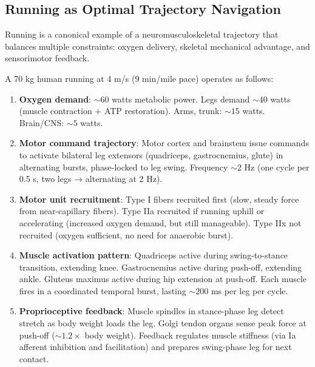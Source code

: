 \subsection{Running as Optimal Trajectory Navigation}
\label{subsec:running-example}

Running is a canonical example of a neuromusculoskeletal trajectory that balances multiple constraints: oxygen delivery, skeletal mechanical advantage, and sensorimotor feedback.

\begin{example}
\label{ex:running-steady}
A 70 kg human running at 4 m/s (9 min/mile pace) operates as follows:

\begin{enumerate}[label=(\arabic*), noitemsep]
\item \textbf{Oxygen demand}: $\sim 60$ watts metabolic power. Legs demand $\sim 40$ watts (muscle contraction + ATP restoration). Arms, trunk: $\sim 15$ watts. Brain/CNS: $\sim 5$ watts.

\item \textbf{Motor command trajectory}: Motor cortex and brainstem issue commands to activate bilateral leg extensors (quadriceps, gastrocnemius, glute) in alternating bursts, phase-locked to leg swing. Frequency $\sim 2$ Hz (one cycle per 0.5 s, two legs → alternating at 2 Hz).

\item \textbf{Motor unit recruitment}: Type I fibers recruited first (slow, steady force from near-capillary fibers). Type IIa recruited if running uphill or accelerating (increased oxygen demand, but still manageable). Type IIx not recruited (oxygen sufficient, no need for anaerobic burst).

\item \textbf{Muscle activation pattern}: Quadriceps active during swing-to-stance transition, extending knee. Gastrocnemius active during push-off, extending ankle. Gluteus maximus active during hip extension at push-off. Each muscle fires in a coordinated temporal burst, lasting $\sim 200$ ms per leg per cycle.

\item \textbf{Proprioceptive feedback}: Muscle spindles in stance-phase leg detect stretch as body weight loads the leg. Golgi tendon organs sense peak force at push-off ($\sim 1.2 \times$ body weight). Feedback regulates muscle stiffness (via Ia afferent inhibition and facilitation) and prepares swing-phase leg for next contact.


\end{enumerate}
\end{example}
